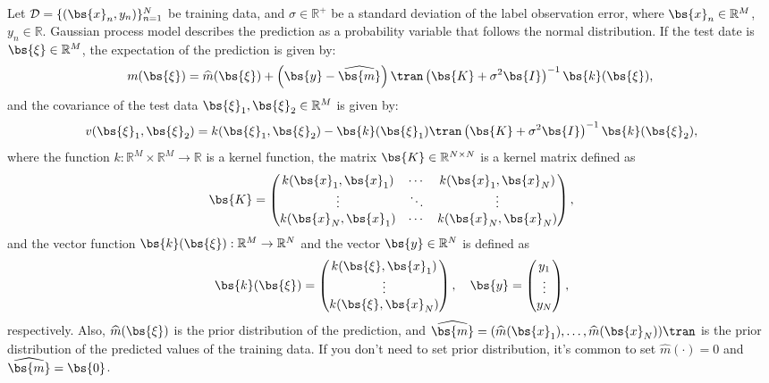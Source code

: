 \documentclass[twocolumn,a4paper,10pt]{article}
\begin{document}
Let $\mathcal{D} = \{(\bs{x}_n, y_n)\}_{n=1}^{N}$ be training data, and $\sigma \in \mathbb{R}^{+}$
be a standard deviation of the label observation error, where $\bs{x}_n \in \mathbb{R}^M$, $y_n \in \mathbb{R}$.
Gaussian process model describes the prediction as a probability variable that follows the normal distribution.
If the test date is $\bs{\xi} \in \mathbb{R}^M$, the expectation of the prediction is given by:
\begin{equation}
    m (\bs{\xi}) = \widehat{m} (\bs{\xi}) + \left( \bs{y} - \widehat{\bs{m}} \right)\tran
    \left (\bs{K} + \sigma^2 \bs{I} \right)^{-1} \bs{k} (\bs {\xi}),
    \label{eqn:gp_exp} \\
\end{equation}
and the covariance of the test data $\bs{\xi}_1, \bs{\xi}_2 \in \mathbb{R}^M$ is given by:
\begin{equation}
    v (\bs{\xi}_1, \bs{\xi}_2) = k (\bs{\xi}_1, \bs{\xi}_2)
    - \bs{k} (\bs{\xi}_1)\tran \left( \bs{K} + \sigma^2 \bs{I} \right)^{-1} \bs{k} (\bs{\xi}_2),
    \label{eqn:gp_cov}
\end{equation}
where the function $k: \mathbb{R}^M \times \mathbb{R}^M \to \mathbb{R}$ is a kernel function,
the matrix $\bs{K} \in \mathbb{R}^{N \times N}$ is a kernel matrix defined as
\begin {equation}
    \bs{K} = \begin{pmatrix}
        k (\bs{x}_1, \bs{x}_1) & \cdots & k (\bs{x}_1, \bs{x}_N) \\
        \vdots & \ddots & \vdots \\
        k (\bs{x}_N, \bs{x}_1) & \cdots & k (\bs{x}_N, \bs{x}_N) \\
    \end{pmatrix},
    \label{eqn:def_kernel_matrix}
\end{equation}
and the vector function $\bs{k} (\bs {\xi}): \mathbb{R}^M \to \mathbb{R}^N$ and
the vector $\bs{y} \in \mathbb{R}^N$ is defined as
\begin{equation}
    \bs{k} (\bs{\xi}) = \begin{pmatrix}
        k (\bs{\xi}, \bs{x}_1) \\
        \vdots \\
        k (\bs{\xi}, \bs{x}_N) \\
    \end{pmatrix},
    \hspace{10pt}
    \bs{y} = \begin{pmatrix}
        y_1 \\ \vdots \\ y_N \\
    \end{pmatrix},
\end{equation}
respectively.
Also, $\widehat{m} (\bs{\xi})$ is the prior distribution of the prediction, and
$\widehat{\bs{m}} = (\widehat{m} (\bs{x}_1), \ldots, \widehat{m} (\bs{x}_N))\tran$ is
the prior distribution of the predicted values of the training data. If you don't need to set
prior distribution, it's common to set $\widehat{m} (\cdot) = 0$ and $\widehat{\bs{m}} = \bs{0}$.
\end{document}
